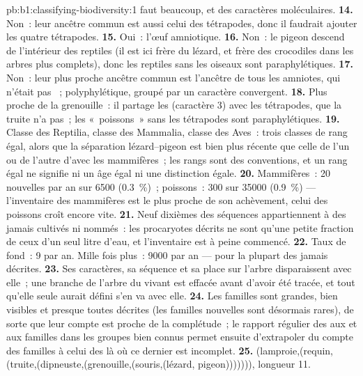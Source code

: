 \begin{solution}{pb:b1:classifying-biodiversity:1}
faut beaucoup, et des caractères moléculaires.
\textbf{14.} Non~: leur ancêtre commun est aussi celui des tétrapodes,
donc il faudrait ajouter les quatre tétrapodes.
\textbf{15.} Oui~: l'œuf amniotique.
\textbf{16.} Non~: le pigeon descend de l'intérieur des reptiles (il est
ici frère du lézard, et frère des crocodiles dans les arbres plus
complets), donc les reptiles sans les oiseaux sont paraphylétiques.
\textbf{17.} Non~: leur plus proche ancêtre commun est l'ancêtre de tous
les amniotes, qui n'était pas ~; polyphylétique, groupé par un
caractère convergent.
\textbf{18.} Plus proche de la grenouille~: il partage les 
(caractère 3) avec les tétrapodes, que la truite n'a pas~; les
«~poissons~» sans les tétrapodes sont paraphylétiques.
\textbf{19.} Classe des Reptilia, classe des Mammalia, classe des
Aves~: trois classes de rang égal, alors que la séparation
lézard--pigeon est bien plus récente que celle de l'un ou de l'autre
d'avec les mammifères~; les rangs sont des conventions, et un rang égal
ne signifie ni un âge égal ni une distinction égale.
\textbf{20.} Mammifères~: \num{20} nouvelles par an sur \num{6500}
(\qty{0.3}{\%})~; poissons~: \num{300} sur \num{35000}
(\qty{0.9}{\%}) --- l'inventaire des mammifères est le plus proche de
son achèvement, celui des poissons croît encore vite.
\textbf{21.} Neuf dixièmes des séquences appartiennent à des 
jamais cultivés ni nommés~: les procaryotes décrits ne sont qu'une
petite fraction de ceux d'un seul litre d'eau, et l'inventaire est à
peine commencé.
\textbf{22.} Taux de fond~: \num{9} par an. Mille fois plus~: \num{9000}
par an --- pour la plupart des  jamais décrites.
\textbf{23.} Ses caractères, sa séquence et sa place sur l'arbre
disparaissent avec elle~; une branche de l'arbre du vivant est effacée
avant d'avoir été tracée, et tout  qu'elle seule aurait défini s'en
va avec elle.
\textbf{24.} Les familles sont grandes, bien visibles et presque toutes
décrites (les familles nouvelles sont désormais rares), de sorte que
leur compte est proche de la complétude~; le rapport régulier des
 aux  et aux familles dans les groupes bien connus permet
ensuite d'extrapoler du compte des familles à celui des  là où
ce dernier est incomplet.
\textbf{25.} (lamproie,(requin,(truite,(dipneuste,(grenouille,(souris,(lézard,
pigeon))))))), longueur \num{11}.
\end{solution}
